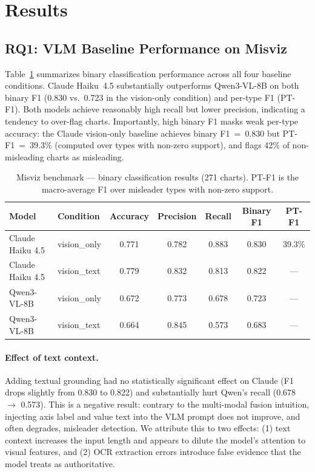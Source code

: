 \section{Results}
\label{sec:results}

\subsection{RQ1: VLM Baseline Performance on Misviz}
\label{sec:rq1}

Table~\ref{tab:misviz_main} summarizes binary classification performance across all four baseline conditions. Claude Haiku~4.5 substantially outperforms Qwen3-VL-8B on both binary F1 (0.830 vs.\ 0.723 in the vision-only condition) and per-type F1 (PT-F1). Both models achieve reasonably high recall but lower precision, indicating a tendency to over-flag charts. Importantly, high binary F1 masks weak per-type accuracy: the Claude vision-only baseline achieves binary F1~=~0.830 but PT-F1~=~39.3\% (computed over types with non-zero support), and flags 42\% of non-misleading charts as misleading.

\begin{table}[h]
  \centering
  \caption{Misviz benchmark --- binary classification results (271 charts). PT-F1 is the macro-average F1 over misleader types with non-zero support.}
  \label{tab:misviz_main}
  \small
  \begin{tabular}{llccccc}
    \toprule
    Model & Condition & Accuracy & Precision & Recall & Binary F1 & PT-F1 \\
    \midrule
    Claude Haiku 4.5 & vision\_only & 0.771 & 0.782 & 0.883 & 0.830 & 39.3\% \\
    Claude Haiku 4.5 & vision\_text & 0.779 & 0.832 & 0.813 & 0.822 & ---    \\
    Qwen3-VL-8B      & vision\_only & 0.672 & 0.773 & 0.678 & 0.723 & ---    \\
    Qwen3-VL-8B      & vision\_text & 0.664 & 0.845 & 0.573 & 0.683 & ---    \\
    \bottomrule
  \end{tabular}
\end{table}

\paragraph{Effect of text context.}
Adding textual grounding had no statistically significant effect on Claude (F1 drops slightly from 0.830 to 0.822) and substantially hurt Qwen's recall (0.678 $\to$ 0.573). This is a negative result: contrary to the multi-modal fusion intuition, injecting axis label and value text into the VLM prompt does not improve, and often degrades, misleader detection. We attribute this to two effects: (1) text context increases the input length and appears to dilute the model's attention to visual features, and (2) OCR extraction errors introduce false evidence that the model treats as authoritative.

